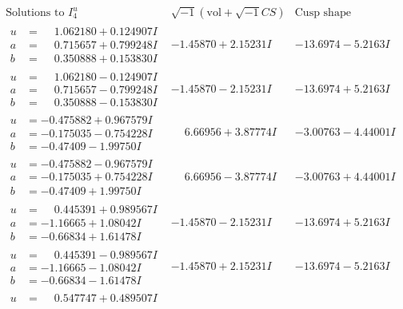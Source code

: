 \documentclass[1p]{elsarticle_modified}
\theoremstyle{definition}
\newcommand{\I}{\sqrt{-1}}
\begin{document}
$$\begin{array}{c|c|c}  
\text{Solutions to }I^u_{4}& \I (\text{vol} + \sqrt{-1}CS) & \text{Cusp shape}\\
 \hline 
\begin{aligned}
u &= \phantom{-}1.062180 + 0.124907 I \\
a &= \phantom{-}0.715657 + 0.799248 I \\
b &= \phantom{-}0.350888 + 0.153830 I\end{aligned}
 & -1.45870 + 2.15231 I & -13.6974 - 5.2163 I \\ \hline\begin{aligned}
u &= \phantom{-}1.062180 - 0.124907 I \\
a &= \phantom{-}0.715657 - 0.799248 I \\
b &= \phantom{-}0.350888 - 0.153830 I\end{aligned}
 & -1.45870 - 2.15231 I & -13.6974 + 5.2163 I \\ \hline\begin{aligned}
u &= -0.475882 + 0.967579 I \\
a &= -0.175035 - 0.754228 I \\
b &= -0.47409 - 1.99750 I\end{aligned}
 & \phantom{-}6.66956 + 3.87774 I & -3.00763 - 4.44001 I \\ \hline\begin{aligned}
u &= -0.475882 - 0.967579 I \\
a &= -0.175035 + 0.754228 I \\
b &= -0.47409 + 1.99750 I\end{aligned}
 & \phantom{-}6.66956 - 3.87774 I & -3.00763 + 4.44001 I \\ \hline\begin{aligned}
u &= \phantom{-}0.445391 + 0.989567 I \\
a &= -1.16665 + 1.08042 I \\
b &= -0.66834 + 1.61478 I\end{aligned}
 & -1.45870 - 2.15231 I & -13.6974 + 5.2163 I \\ \hline\begin{aligned}
u &= \phantom{-}0.445391 - 0.989567 I \\
a &= -1.16665 - 1.08042 I \\
b &= -0.66834 - 1.61478 I\end{aligned}
 & -1.45870 + 2.15231 I & -13.6974 - 5.2163 I \\ \hline\begin{aligned}
u &= \phantom{-}0.547747 + 0.489507 I \\

\end{aligned}
\end{array}$$
\end{document}

